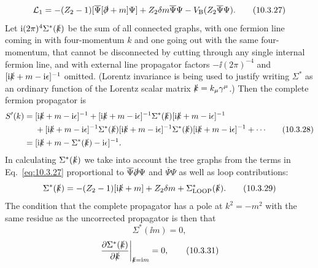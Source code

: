 
\begin{equation}
\mathcal L_1=-(Z_2-1)[\overline\Psi[\sl{\partial}+m]\Psi]
+Z_2\delta m\overline\Psi\Psi
-V_{\mathrm B}(Z_2\overline\Psi\Psi).
\tag{10.3.27}\label{eq:10.3.27}
\end{equation}
Let $\ii(2\pi)^4\Sigma^*(\sl{k})$ be the sum of all connected graphs, with one
fermion line coming in with four-momentum $k$ and one going out with the same
four-momentum, that cannot be disconnected by cutting through any single
internal fermion line, and with external line propagator factors
$-\ii(2\pi)^{-4}$ and $[\ii\sl{k}+m-\ii\epsilon]^{-1}$ omitted. (Lorentz invariance
is being used to justify writing $\Sigma^*$ as an ordinary function of the
Lorentz scalar matrix $\sl{k}=k_\mu\gamma^\mu$.) Then the complete fermion
propagator is
\begin{equation}
\begin{split}
S'(k)={}&[\ii\sl{k}+m-\ii\epsilon]^{-1}
+[\ii\sl{k}+m-\ii\epsilon]^{-1}\Sigma^*(\sl{k})
[\ii\sl{k}+m-\ii\epsilon]^{-1}
\\
&+[\ii\sl{k}+m-\ii\epsilon]^{-1}\Sigma^*(\sl{k})
[\ii\sl{k}+m-\ii\epsilon]^{-1}\Sigma^*(\sl{k})
[\ii\sl{k}+m-\ii\epsilon]^{-1}+\cdots
\\
={}&[\ii\sl{k}+m-\Sigma^*(\sl{k})-\ii\epsilon]^{-1}.
\end{split}
\tag{10.3.28}\label{eq:10.3.28}
\end{equation}
In calculating $\Sigma^*(\sl{k})$ we take into account the tree graphs from
the terms in Eq.~\eqref{eq:10.3.27} proportional to
$\overline\Psi\sl{\partial}\Psi$ and $\overline\Psi\Psi$ as well as loop
contributions:
\begin{equation}
\Sigma^*(\sl{k})=-(Z_2-1)[\ii\sl{k}+m]+Z_2\delta m
+\Sigma^*_{\mathrm{LOOP}}(\sl{k}).
\tag{10.3.29}\label{eq:10.3.29}
\end{equation}
The condition that the complete propagator has a pole at $k^2=-m^2$ with the
same residue as the uncorrected propagator is then that
\begin{equation}
\Sigma^*(\ii m)=0,
\tag{10.3.30}\label{eq:10.3.30}
\end{equation}
\begin{equation}
\left.\frac{\partial\Sigma^*(\sl{k})}{\partial\sl{k}}
\right|_{\sl{k}=\ii m}=0,
\tag{10.3.31}\label{eq:10.3.31}
\end{equation}
